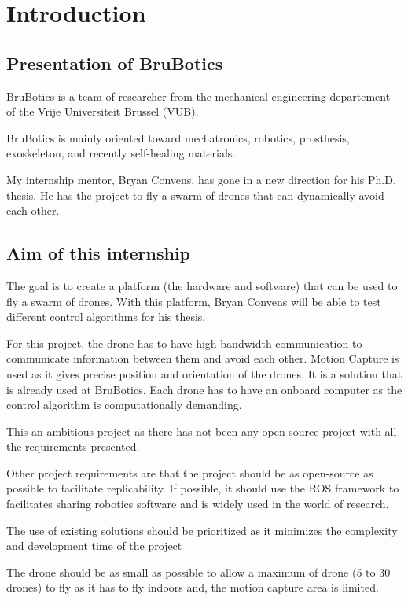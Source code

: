 \chapter{Introduction}

\section{Presentation of BruBotics}

BruBotics is a team of researcher from the mechanical engineering departement of the Vrije Universiteit Brussel (VUB).

BruBotics is mainly oriented toward mechatronics, robotics, prosthesis, exoskeleton, and recently self-healing materials.

My internship mentor, Bryan Convens, has gone in a new direction for his Ph.D. thesis.
He has the project to fly a swarm of drones that can dynamically avoid each other.

\section{Aim of this internship}

The goal is to create a platform (the hardware and software) that can be used to fly a swarm of drones.
With this platform, Bryan Convens will be able to test different control algorithms for his thesis.

For this project, the drone has to have high bandwidth communication to communicate information between them
and avoid each other.
Motion Capture is used as it gives precise position and orientation of the drones. It is a solution that is already used at BruBotics.
Each drone has to have an onboard computer as the control algorithm is computationally demanding.

This an ambitious project as there has not been any open source project with all the requirements presented.

Other project requirements are that the project should be as open-source as possible to facilitate replicability.
If possible, it should use the ROS framework to facilitates sharing robotics software and is widely used in the world of research.

The use of existing solutions should be prioritized as it minimizes the complexity and development time of the project

The drone should be as small as possible to allow a maximum of drone (5 to 30 drones) to fly as it has to fly indoors and, the motion capture area is limited.

